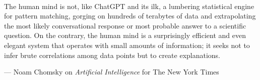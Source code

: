 
~
\vfill
\begin{center}
    \begin{minipage}{8cm}
           The human mind is not, like ChatGPT and its ilk, a lumbering statistical engine for pattern matching, gorging on hundreds of terabytes of data and extrapolating the most likely conversational response or most probable answer to a scientific question. On the contrary, the human mind is a surprisingly efficient and even elegant system that operates with small amounts of information; it seeks not to infer brute correlations among data points but to create explanations.
       
       \begin{flushright}
            --- Noam Chomsky on \textit{Artificial Intelligence} for The New York Times
        \end{flushright}
        
    \end{minipage}
\end{center}
\vfill
